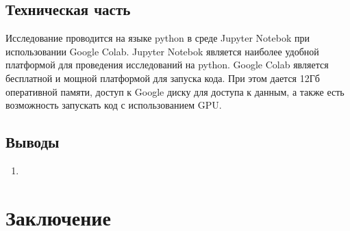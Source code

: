 \documentclass[a4paper,14pt]{article}
\begin{document}
\subsection{Техническая часть}

Исследование проводится на языке python в среде Jupyter Notebok при использовании Google Colab.
Jupyter Notebok является наиболее удобной платформой для проведения исследований на python.
Google Colab является бесплатной и мощной платформой для запуска кода.
При этом дается 12Гб оперативной памяти, доступ к Google диску для доступа к данным, а также есть возможность запускать код с использованием GPU.

\subsection{}

\subsection{Выводы}
\begin{enumerate}
	\itemsep0em 
	\item 
\end{enumerate}

\newpage
\section{Заключение}
\end{document}
